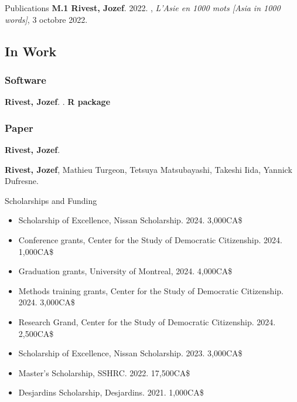 \documentclass{resume} %
\begin{document}
\begin{rSection}{Publications}
{\textbf{M.1 Rivest, Jozef}. 2022. , \textit{L’Asie en 1000 mots [Asia in 1000 words]}, 3 octobre 2022.} \par

\subsection*{In Work}

\subsubsection*{Software}

{\textbf{Rivest, Jozef}. . \textbf{R package}}

\subsubsection*{Paper}

{\textbf{Rivest, Jozef}. }

{\textbf{Rivest, Jozef}, Mathieu Turgeon, Tetsuya Matsubayashi, Takeshi Iida, Yannick Dufresne. }

\end{rSection}

\begin{rSection}{Scholarships and Funding}
\begin{itemize} 
  \item Scholarship of Excellence, Nissan Scholarship. 2024. 3,000CA\$
  \item Conference grants, Center for the Study of Democratic Citizenship. 2024. 1,000CA\$
  \item Graduation grants, University of Montreal, 2024. 4,000CA\$
  \item Methods training grants, Center for the Study of Democratic Citizenship. 2024. 3,000CA\$
  \item Research Grand, Center for the Study of Democratic Citizenship. 2024. 2,500CA\$
  \item Scholarship of Excellence, Nissan Scholarship. 2023. 3,000CA\$
  \item Master's Scholarship, SSHRC. 2022. 17,500CA\$
  \item Desjardins Scholarship, Desjardins. 2021. 1,000CA\$
\end{itemize}

\end{rSection}
\end{document}
